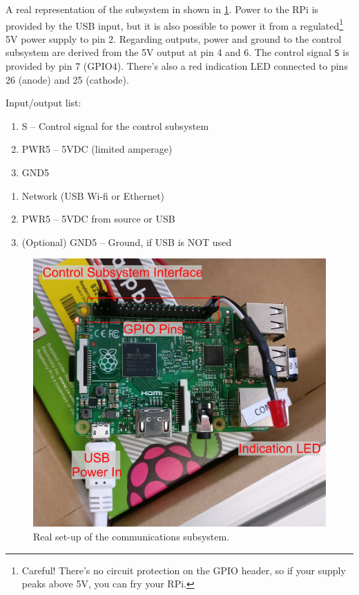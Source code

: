 \documentclass[twoside,a4paper]{refart}
\begin{document}
A real representation of the subsystem in shown in \cref{fig:ph_com}. Power to the RPi is provided by the \mu USB input, but it is also possible to power it from a regulated\footnote{Careful! There's no circuit protection on the GPIO header, so if your supply peaks above 5V, you can fry your RPi.} 5V power supply to pin 2. Regarding outputs, power and ground to the control subsystem are derived from the 5V output at pin 4 and 6. The control signal {\tt S} is provided by pin 7 (GPIO4). There's also a red indication LED connected to pins 26 (anode) and 25 (cathode).



Input/output list:
\begin{enumerate}
	\item  {} S -- Control signal for the control subsystem
	\item PWR5 -- 5VDC (limited amperage)
	\item GND5
\end{enumerate}
\begin{enumerate}
	\item  {} Network (USB Wi-fi or Ethernet)
	\item PWR5 -- 5VDC from source or USB
	\item (Optional) GND5 -- Ground, if USB is NOT used
\end{enumerate}

\begin{figure}[H]
	\centering
	\includegraphics[width=1.0\linewidth]{ph_com}
	\caption{Real set-up of the communications subsystem.}
	\label{fig:ph_com}
\end{figure}
\end{document}
